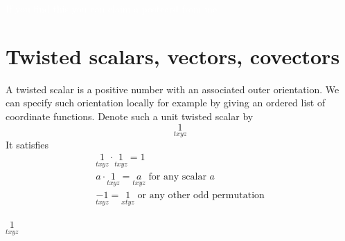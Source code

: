 \documentclass[\ifafour a4paper,12pt,\else a5paper,10pt,\fi%
onecolumn,oneside,article,%
british%
]{memoir}
\makeatletter
\theoremstyle{remark}
\theoremstyle{innote}
\def\sum{\DOTSI\sumop\slimits@}
\newcommand*{\de}{\partialup}%
\DeclareMathOperator{\tr}{tr}%
\newcommand*{\p}{\mathrm{P}}%
\renewcommand*{\|}[1][]{\nonscript\,#1\vert\nonscript\;\mathopen{}}
\newcommand*{\tsum}{\mathop{\textstyle\sum}\nolimits}
\newcommand*{\ts}[1][txyz]{\underset{#1}{1}}
\makeatother
\begin{document}
\textcolor{white}{If you find this you can claim a postcard from me.}



\section{Twisted scalars, vectors, covectors}
\label{sec:twisted}

A twisted scalar is a positive number with an associated outer orientation.
We can specify such orientation locally for example by giving an ordered
list of coordinate functions. Denote such a unit twisted scalar by
\begin{equation}
  \label{eq:twisted_scalar}
  \ts
\end{equation}
It satisfies
\begin{equation}
  \label{eq:twisted_scalar_properties}
  \begin{gathered}
    \ts \cdot \ts = 1
    \\
    a \cdot \ts = \underset{txyz}{a} \text{ for any scalar $a$}
    \\
    \underset{txyz}{-1} = \ts[xtyz] \text{ or any other odd permutation}
\end{gathered}
\end{equation}



$\ts$






\end{document}
